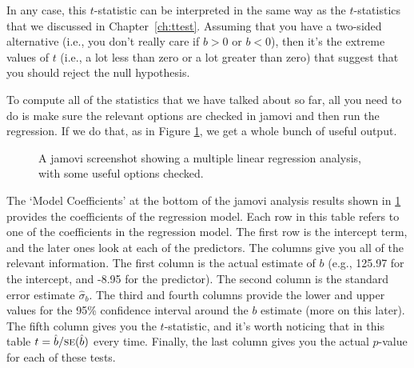 In any case, this $t$-statistic can be interpreted in the same way as the $t$-statistics that we discussed in Chapter~\ref{ch:ttest}. Assuming that you have a two-sided alternative (i.e., you don't really care if $b >0$ or $b < 0$), then it's the extreme values of $t$ (i.e., a lot less than zero or a lot greater than zero) that suggest that you should reject the null hypothesis. 



To compute all of the statistics that we have talked about so far, all you need to do is make sure the relevant options are checked in jamovi and then run the regression. If we do that, as in Figure \ref{fig:reg2}, we get a whole bunch of useful output.

\begin{figure}[!htb]
\begin{center}
\caption{A jamovi screenshot showing a multiple linear regression analysis, with some useful options checked.}
\HR
\label{fig:reg2}
\end{center}
\end{figure}

The `Model Coefficients' at the bottom of the jamovi analysis results shown in \ref{fig:reg2} provides the coefficients of the regression model. Each row in this table refers to one of the coefficients in the regression model. The first row is the intercept term, and the later ones look at each of the predictors. The columns give you all of the relevant information. The first column is the actual estimate of $b$ (e.g., 125.97 for the intercept, and -8.95 for the  predictor). The second column is the standard error estimate $\hat\sigma_b$. The third and fourth columns provide the lower and upper values for the 95\% confidence interval around the $b$ estimate (more on this later). The fifth column gives you the $t$-statistic, and it's worth noticing that in this table $t= \hat{b}/ \mbox{\textsc{se}}(\hat{b})$ every time. Finally, the last column gives you the actual $p$-value for each of these tests. 

